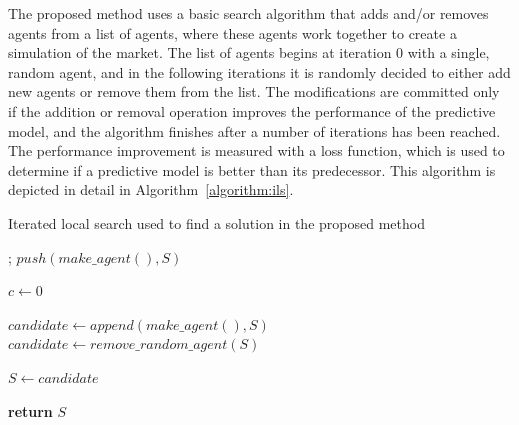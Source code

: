 \documentclass{ieeeaccess}
\begin{document}
The proposed method uses a basic search algorithm that adds and/or removes agents from a list of agents, where these agents work together to create a simulation of the market. The list of agents begins at iteration 0 with a single, random agent, and in the following iterations it is randomly decided to either add new agents or remove them from the list. The modifications are committed only if the addition or removal operation improves the performance of the predictive model, and the algorithm finishes after a number of iterations has been reached. 
The performance improvement is measured with a loss function, which is used to determine if a predictive model is better than its predecessor. %
This algorithm is depicted in detail in Algorithm~\ref{algorithm:ils}. %

\begin{algorithm}
  \caption{Iterated local search used to find a solution in the proposed method}
  \label{algorithm:ils}
  \begin{algorithmic}[1]
    ;
    \State $push(make\_agent(), S)$ %

    \State $c \gets 0$

    \State $candidate \gets append(make\_agent(), S)$
    \Else
    \State $candidate \gets remove\_random\_agent(S)$
    \EndIf

    \State $S \gets candidate$
    \EndIf
    
    \EndWhile

    \State \textbf{return} $S$
    \EndProcedure
  \end{algorithmic}
\end{algorithm}
\end{document}
